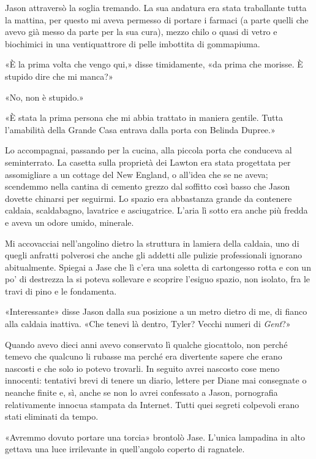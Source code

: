 Jason attraversò la soglia tremando. La sua andatura era stata
traballante tutta la mattina, per questo mi aveva permesso di portare i
farmaci (a parte quelli che avevo già messo da parte per la sua cura),
mezzo chilo o quasi di vetro e biochimici in una ventiquattrore di pelle
imbottita di gommapiuma.

«È la prima volta che vengo qui,» disse timidamente, «da prima che
morisse. È stupido dire che mi manca?»

«No, non è stupido.»

«È stata la prima persona che mi abbia trattato in maniera gentile.
Tutta l'amabilità della Grande Casa entrava dalla porta con Belinda
Dupree.»

Lo accompagnai, passando per la cucina, alla piccola porta che conduceva
al seminterrato. La casetta sulla proprietà dei Lawton era stata
progettata per assomigliare a un cottage del New England, o all'idea che
se ne aveva; scendemmo nella cantina di cemento grezzo dal soffitto così
basso che Jason dovette chinarsi per seguirmi. Lo spazio era abbastanza
grande da contenere caldaia, scaldabagno, lavatrice e asciugatrice.
L'aria lì sotto era anche più fredda e aveva un odore umido, minerale.

Mi accovacciai nell'angolino dietro la struttura in lamiera della
caldaia, uno di quegli anfratti polverosi che anche gli addetti alle
pulizie professionali ignorano abitualmente. Spiegai a Jase che lì c'era
una soletta di cartongesso rotta e con un po' di destrezza la si poteva
sollevare e scoprire l'esiguo spazio, non isolato, fra le travi di pino
e le fondamenta.

«Interessante» disse Jason dalla sua posizione a un metro dietro di me,
di fianco alla caldaia inattiva. «Che tenevi là dentro, Tyler? Vecchi
numeri di \emph{Gent}?»

Quando avevo dieci anni avevo conservato lì qualche giocattolo, non
perché temevo che qualcuno li rubasse ma perché era divertente sapere
che erano nascosti e che solo io potevo trovarli. In seguito avrei
nascosto cose meno innocenti: tentativi brevi di tenere un diario,
lettere per Diane mai consegnate o neanche finite e, sì, anche se non lo
avrei confessato a Jason, pornografia relativamente innocua stampata da
Internet. Tutti quei segreti colpevoli erano stati eliminati da tempo.

«Avremmo dovuto portare una torcia» brontolò Jase. L'unica lampadina in
alto gettava una luce irrilevante in quell'angolo coperto di ragnatele.

